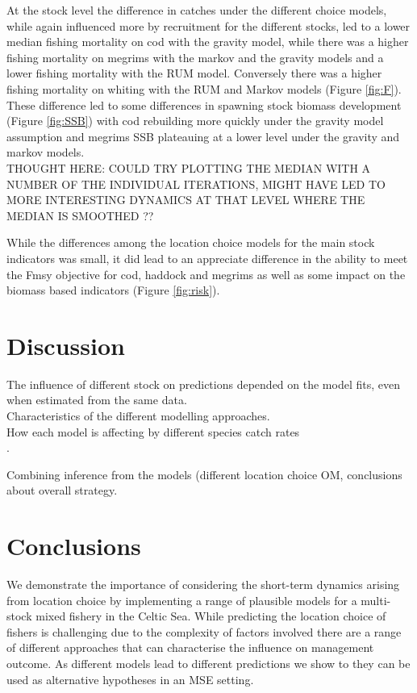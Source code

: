 \documentclass[12pt, halfline, a4paper]{ouparticle}
\begin{document}
At the stock level the difference in catches under the different choice models,
while again influenced more by recruitment for the different stocks, led to a
lower median fishing mortality on cod with the gravity model, while there was a
higher fishing mortality on megrims with the markov and the gravity models and
a lower fishing mortality with the RUM model. Conversely there was a higher
fishing mortality on whiting with the RUM and Markov models (Figure
\ref{fig:F}). These difference led to some differences in spawning stock
biomass development (Figure \ref{fig:SSB}) with cod rebuilding more quickly
under the gravity model assumption and megrims SSB plateauing at a lower level
under the gravity and markov models. \\

THOUGHT HERE: COULD TRY PLOTTING THE MEDIAN WITH A NUMBER OF THE INDIVIDUAL
ITERATIONS, MIGHT HAVE LED TO MORE INTERESTING DYNAMICS AT THAT LEVEL WHERE THE
MEDIAN IS SMOOTHED ??

While the differences among the location choice models for the main stock
indicators was small, it did lead to an appreciate difference in the ability to
meet the Fmsy objective for cod, haddock and megrims as well as some impact on
the biomass based indicators (Figure \ref{fig:risk}). \\

\section{Discussion}
\label{dis}

The influence of different stock on predictions depended on the model fits,
even when estimated from the same data. \\ 

Characteristics of the different modelling approaches. \\

How each model is affecting by different species catch rates \\.

Combining inference from the models (different location choice OM, conclusions
about overall strategy. \\


\section{Conclusions}
\label{con}

We demonstrate the importance of considering the short-term dynamics arising
from location choice by implementing a range of plausible models for a
multi-stock mixed fishery in the Celtic Sea. While predicting the location
choice of fishers is challenging due to the complexity of factors involved
there are a range of different approaches that can characterise the influence
on management outcome. As different models lead to different predictions we
show to they can be used as alternative hypotheses in an MSE setting. \\
\end{document}
